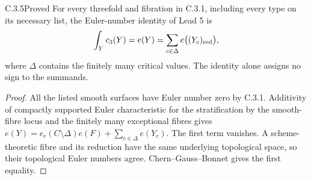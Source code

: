 \begin{idstatement}{C.3.5}{Proved}\label{st:C.3.5}
For every threefold and fibration in C.3.1, including every type on
its necessary list, the Euler-number identity of Lead 5 is
\[
\int_Y c_3(Y)=e(Y)=\sum_{c\in\Delta}e\bigl((Y_c)_{\rm red}\bigr),
\]
where $\Delta$ contains the finitely many critical values.
The identity alone assigns no sign to the summands.
\end{idstatement}
\begin{proof}
All the listed smooth surfaces have Euler number zero by C.3.1.
Additivity of compactly supported Euler characteristic for the
stratification by the smooth-fibre locus and the finitely many
exceptional fibres gives
$e(Y)=e_c(C\setminus\Delta)e(F)+\sum_{c\in\Delta}e(Y_c)$.
The first term vanishes. A scheme-theoretic fibre and its reduction
have the same underlying topological space, so their topological
Euler numbers agree. Chern--Gauss--Bonnet gives the first equality.
\end{proof}



